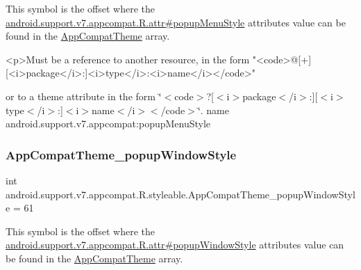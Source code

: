 This symbol is the offset where the \hyperlink{classandroid_1_1support_1_1v7_1_1appcompat_1_1R_1_1attr_adaf268c570b00062a1054b7f97f96b38}{android.\+support.\+v7.\+appcompat.\+R.\+attr\#popup\+Menu\+Style} attribute\textquotesingle{}s value can be found in the \hyperlink{classandroid_1_1support_1_1v7_1_1appcompat_1_1R_1_1styleable_a5c42f89e8a410c323be34208d75c430b}{App\+Compat\+Theme} array.

\begin{DoxyVerb}      <p>Must be a reference to another resource, in the form "<code>@[+][<i>package</i>:]<i>type</i>:<i>name</i></code>"
\end{DoxyVerb}
 or to a theme attribute in the form \char`\"{}$<$code$>$?\mbox{[}$<$i$>$package$<$/i$>$\+:\mbox{]}\mbox{[}$<$i$>$type$<$/i$>$\+:\mbox{]}$<$i$>$name$<$/i$>$$<$/code$>$\char`\"{}.  name android.\+support.\+v7.\+appcompat\+:popup\+Menu\+Style \mbox{\label{classandroid_1_1support_1_1v7_1_1appcompat_1_1R_1_1styleable_ab49e956338c41cad14a71489cf3e3ad1}} 
\subsubsection{\texorpdfstring{App\+Compat\+Theme\+\_\+popup\+Window\+Style}{AppCompatTheme\_popupWindowStyle}}
{\footnotesize\ttfamily int android.\+support.\+v7.\+appcompat.\+R.\+styleable.\+App\+Compat\+Theme\+\_\+popup\+Window\+Style = 61\hspace{0.3cm}{\ttfamily [static]}}

This symbol is the offset where the \hyperlink{classandroid_1_1support_1_1v7_1_1appcompat_1_1R_1_1attr_a5b684a34260eff69eb7de3101f52d178}{android.\+support.\+v7.\+appcompat.\+R.\+attr\#popup\+Window\+Style} attribute\textquotesingle{}s value can be found in the \hyperlink{classandroid_1_1support_1_1v7_1_1appcompat_1_1R_1_1styleable_a5c42f89e8a410c323be34208d75c430b}{App\+Compat\+Theme} array.

